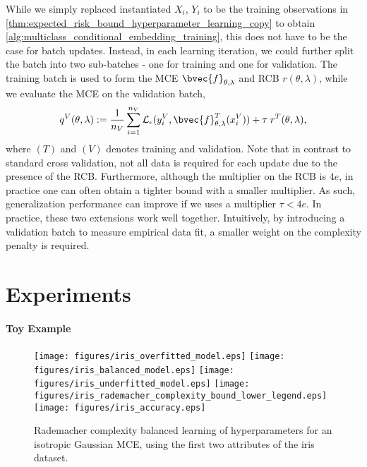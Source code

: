 \documentclass[twoside]{article}
\begin{document}
		While we simply replaced instantiated $X_{i}$, $Y_{i}$ to be the training observations in \cref{thm:expected_risk_bound_hyperparameter_learning_copy} to obtain \cref{alg:multiclass_conditional_embedding_training}, this does not have to be the case for batch updates. Instead, in each learning iteration, we could further split the batch into two sub-batches - one for training and one for validation. The training batch is used to form the \gls{MCE} $\bvec{f}_{\theta, \lambda}$ and \gls{RCB} $r(\theta, \lambda)$, while we evaluate the \gls{MCE} on the validation batch,
		\begin{equation}
		q^{V}(\theta, \lambda) := \frac{1}{n_{V}} \sum_{i = 1}^{n_{V}} \mathcal{L}_{\epsilon}(y^{V}_{i}, \bvec{f}^{T}_{\theta, \lambda}(x^{V}_{i})) + \tau \; r^{T}(\theta, \lambda),
		\label{eq:validation_learning_objective}
		\end{equation}
		where $(T)$ and $(V)$ denotes training and validation. Note that in contrast to standard cross validation, not all data is required for each update due to the presence of the \gls{RCB}. Furthermore, although the multiplier on the \gls{RCB} is $4 e$, in practice one can often obtain a tighter bound with a smaller multiplier. As such, generalization performance can improve if we uses a multiplier $\tau < 4 e$. In practice, these two extensions work well together. Intuitively, by introducing a validation batch to measure empirical data fit, a smaller weight on the complexity penalty is required. 
		
	
	\section{Experiments}
	\label{sec:experiments}
	
	\paragraph{Toy Example}
	
		\begin{figure*}[t]
			\centering
			\texttt{[image: figures/iris\_overfitted\_model.eps]}
			\texttt{[image: figures/iris\_balanced\_model.eps]}
			\texttt{[image: figures/iris\_underfitted\_model.eps]}
			\texttt{[image: figures/iris\_rademacher\_complexity\_bound\_lower\_legend.eps]}
			\texttt{[image: figures/iris\_accuracy.eps]}
			\caption{Rademacher complexity balanced learning of hyperparameters for an isotropic Gaussian \gls{MCE}, using the first two attributes of the iris dataset.}
			\label{fig:iris}
		\end{figure*}
		
\end{document}
